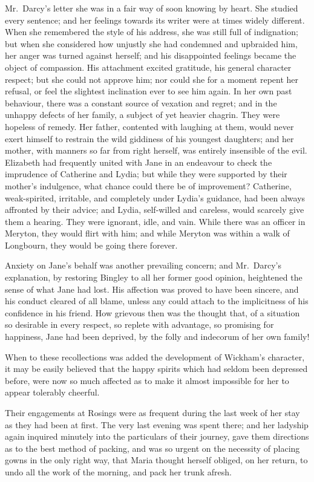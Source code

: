 Mr.\ Darcy's letter she was in a fair way of soon knowing by
heart.  She studied every sentence; and her feelings towards its
writer were at times widely different.  When she remembered the
style of his address, she was still full of indignation; but when
she considered how unjustly she had condemned and upbraided him,
her anger was turned against herself; and his disappointed
feelings became the object of compassion.  His attachment
excited gratitude, his general character respect; but she could
not approve him; nor could she for a moment repent her refusal,
or feel the slightest inclination ever to see him again.  In
her own past behaviour, there was a constant source of vexation
and regret; and in the unhappy defects of her family, a subject
of yet heavier chagrin.  They were hopeless of remedy.  Her father,
contented with laughing at them, would never exert himself to
restrain the wild giddiness of his youngest daughters; and her
mother, with manners so far from right herself, was entirely
insensible of the evil.  Elizabeth had frequently united with Jane
in an endeavour to check the imprudence of Catherine and Lydia;
but while they were supported by their mother's indulgence, what
chance could there be of improvement?  Catherine, weak-spirited,
irritable, and completely under Lydia's guidance, had been always
affronted by their advice; and Lydia, self-willed and careless,
would scarcely give them a hearing.  They were ignorant, idle, and
vain.  While there was an officer in Meryton, they would flirt
with him; and while Meryton was within a walk of Longbourn, they
would be going there forever.

Anxiety on Jane's behalf was another prevailing concern; and
Mr.\ Darcy's explanation, by restoring Bingley to all her former
good opinion, heightened the sense of what Jane had lost.  His
affection was proved to have been sincere, and his conduct
cleared of all blame, unless any could attach to the implicitness
of his confidence in his friend.  How grievous then was the
thought that, of a situation so desirable in every respect, so
replete with advantage, so promising for happiness, Jane had
been deprived, by the folly and indecorum of her own family!

When to these recollections was added the development of Wickham's
character, it may be easily believed that the happy spirits which
had seldom been depressed before, were now so much affected as to
make it almost impossible for her to appear tolerably cheerful.

Their engagements at Rosings were as frequent during the last
week of her stay as they had been at first.  The very last evening
was spent there; and her ladyship again inquired minutely into
the particulars of their journey, gave them directions as to the
best method of packing, and was so urgent on the necessity of
placing gowns in the only right way, that Maria thought herself
obliged, on her return, to undo all the work of the morning, and
pack her trunk afresh.

